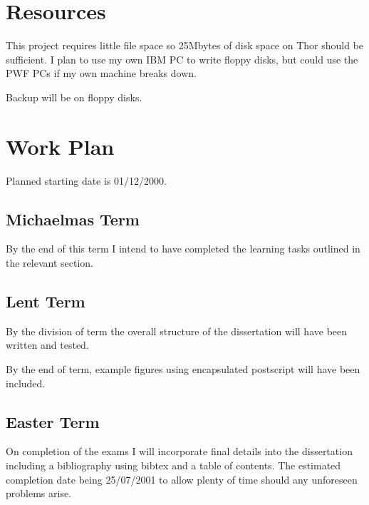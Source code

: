 \section*{Resources}

This project requires little file space so 25Mbytes of disk space on Thor
should be sufficient. I plan to use my own IBM PC to write floppy disks, 
but could use the PWF PCs if my own machine breaks down. 

Backup will be on floppy disks.

\section*{Work Plan}

Planned starting date is 01/12/2000.

\subsection*{Michaelmas Term} 

By the end of this term I intend to have completed the learning tasks 
outlined in the relevant section.


\subsection*{Lent Term}

By the division of term the overall structure of the dissertation
will have been written and tested.

By the end of term, example figures using encapsulated postscript
will have been included.
 

\subsection*{Easter Term}

On completion of the exams I will incorporate final details into 
the dissertation including a bibliography using bibtex and a table of contents.
The estimated completion date being 25/07/2001 to allow 
plenty of time should any unforeseen problems arise.

